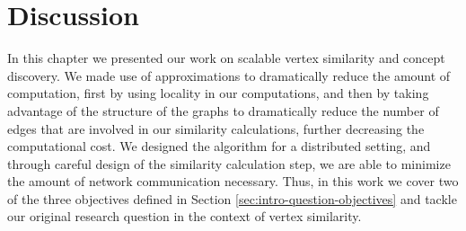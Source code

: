 \section{Discussion}
\label{sec:concepts-discussion}

In this chapter we presented our work on scalable vertex similarity and concept
discovery. We made use of approximations to dramatically reduce the amount of
computation, first by using locality in our computations, and then by taking
advantage of the structure of the graphs to dramatically reduce the number of
edges that are involved in our similarity calculations, further decreasing the
computational cost. We designed the algorithm for a distributed setting, and
through careful design of the similarity calculation step, we are able to minimize
the amount of network communication necessary. Thus, in this work we cover
two of the three objectives defined in Section \ref{sec:intro-question-objectives}
and tackle our original research question in the context of vertex similarity.